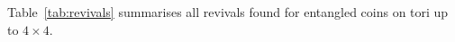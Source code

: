 Table~\ref{tab:revivals} summarises all revivals found for entangled
coins on tori up to $4 \times 4$.
